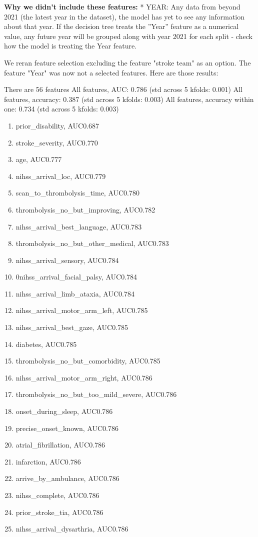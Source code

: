 \textbf{Why we didn't include these features:}
* YEAR: Any data from beyond 2021 (the latest year in the dataset), the model has yet to see any information about that year. If the decision tree treats the ”Year” feature as a numerical value, any future year will be grouped along with year 2021 for each split - check how the model is treating the Year feature.

We reran feature selection excluding the feature "stroke team" as an option. The feature "Year" was now not a selected features. Here are those results:

There are 56 features
All features, AUC: 0.786 (std across 5 kfolds: 0.001)
All features, accuracy: 0.387 (std across 5 kfolds: 0.003)
All features, accuracy within one: 0.734 (std across 5 kfolds: 0.003)

\begin{enumerate}
    \item prior\_disability, AUC0.687
    \item stroke\_severity, AUC0.770
    \item age, AUC0.777
    \item nihss\_arrival\_loc, AUC0.779
    \item scan\_to\_thrombolysis\_time, AUC0.780
    \item thrombolysis\_no\_but\_improving, AUC0.782
    \item nihss\_arrival\_best\_language, AUC0.783
    \item thrombolysis\_no\_but\_other\_medical, AUC0.783
    \item nihss\_arrival\_sensory, AUC0.784
    \item 0nihss\_arrival\_facial\_palsy, AUC0.784
    \item nihss\_arrival\_limb\_ataxia, AUC0.784
    \item nihss\_arrival\_motor\_arm\_left, AUC0.785
    \item nihss\_arrival\_best\_gaze, AUC0.785
    \item diabetes, AUC0.785
    \item thrombolysis\_no\_but\_comorbidity, AUC0.785
    \item nihss\_arrival\_motor\_arm\_right, AUC0.786
    \item thrombolysis\_no\_but\_too\_mild\_severe, AUC0.786
    \item onset\_during\_sleep, AUC0.786
    \item precise\_onset\_known, AUC0.786
    \item atrial\_fibrillation, AUC0.786
    \item infarction, AUC0.786
    \item arrive\_by\_ambulance, AUC0.786
    \item nihss\_complete, AUC0.786
    \item prior\_stroke\_tia, AUC0.786
    \item nihss\_arrival\_dysarthria, AUC0.786
\end{enumerate}

